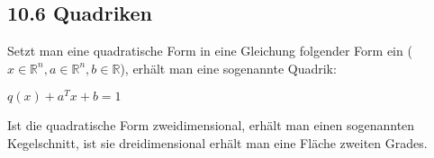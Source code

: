\subsection{10.6 Quadriken}{
\vskip1pt
Setzt man eine quadratische Form in eine Gleichung folgender Form ein ($x \in \mathbb{R}^n, a \in \mathbb{R}^n, b \in \mathbb{R}$), erhält man eine sogenannte Quadrik:

\begin{center} $q(x) + a^Tx + b = 1 $\end{center}


Ist die quadratische Form zweidimensional, erhält man einen sogenannten Kegelschnitt, ist sie dreidimensional erhält man eine Fläche zweiten Grades.
}
\colbreak
